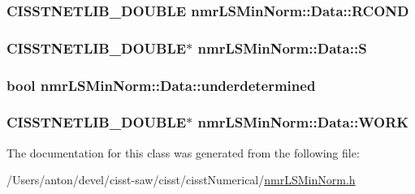 \subsubsection[{R\+C\+O\+N\+D}]{\setlength{\rightskip}{0pt plus 5cm}C\+I\+S\+S\+T\+N\+E\+T\+L\+I\+B\+\_\+\+D\+O\+U\+B\+L\+E nmr\+L\+S\+Min\+Norm\+::\+Data\+::\+R\+C\+O\+N\+D}\label{classnmr_l_s_min_norm_1_1_data_a316a55d64f37b94fc0c15d1283cd1426}
\hypertarget{classnmr_l_s_min_norm_1_1_data_afee9998d9b61d300a4e9403e8189aede}{}
\subsubsection[{S}]{\setlength{\rightskip}{0pt plus 5cm}C\+I\+S\+S\+T\+N\+E\+T\+L\+I\+B\+\_\+\+D\+O\+U\+B\+L\+E$\ast$ nmr\+L\+S\+Min\+Norm\+::\+Data\+::\+S}\label{classnmr_l_s_min_norm_1_1_data_afee9998d9b61d300a4e9403e8189aede}
\hypertarget{classnmr_l_s_min_norm_1_1_data_aa0ce32b53580c83249841c05d59400a9}{}
\subsubsection[{underdetermined}]{\setlength{\rightskip}{0pt plus 5cm}bool nmr\+L\+S\+Min\+Norm\+::\+Data\+::underdetermined}\label{classnmr_l_s_min_norm_1_1_data_aa0ce32b53580c83249841c05d59400a9}
\hypertarget{classnmr_l_s_min_norm_1_1_data_a1b4ef9acbf885be856123c9d0c8cd67d}{}
\subsubsection[{W\+O\+R\+K}]{\setlength{\rightskip}{0pt plus 5cm}C\+I\+S\+S\+T\+N\+E\+T\+L\+I\+B\+\_\+\+D\+O\+U\+B\+L\+E$\ast$ nmr\+L\+S\+Min\+Norm\+::\+Data\+::\+W\+O\+R\+K}\label{classnmr_l_s_min_norm_1_1_data_a1b4ef9acbf885be856123c9d0c8cd67d}


The documentation for this class was generated from the following file\+:\begin{DoxyCompactItemize}
\item 
/\+Users/anton/devel/cisst-\/saw/cisst/cisst\+Numerical/\hyperlink{nmr_l_s_min_norm_8h}{nmr\+L\+S\+Min\+Norm.\+h}\end{DoxyCompactItemize}
